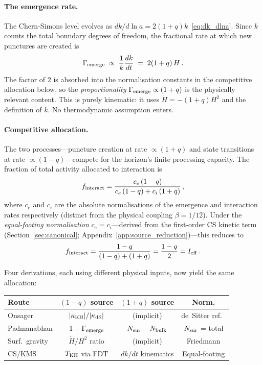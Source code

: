 \documentclass[aps,prd,twocolumn,10pt,superscriptaddress,nofootinbib]{revtex4-2}
\begin{document}
\paragraph{The emergence rate.}

The Chern-Simons level evolves as
$dk/d\ln a = 2(1+q)k$~\eqref{eq:dk_dlna}.  Since $k$ counts
the total boundary degrees of freedom, the fractional rate at
which new punctures are created is
\begin{equation}
\Gamma_{\rm emerge} \;\propto\;
  \frac{1}{k}\frac{dk}{dt} \;=\; 2(1+q)\,H\,.
\label{eq:rate_emerge}
\end{equation}
The factor of $2$ is absorbed into the normalisation constants
in the competitive allocation below, so the
\emph{proportionality} $\Gamma_{\rm emerge} \propto (1+q)$ is the
physically relevant content.  This is purely kinematic: it uses
$\dot{H} = -(1+q)H^2$ and the definition of $k$.  No
thermodynamic assumption enters.


\paragraph{Competitive allocation.}

The two processes---puncture creation at rate $\propto (1+q)$ and
state transitions at rate $\propto (1-q)$---compete for the
horizon's finite processing capacity.  The fraction of total
activity allocated to interaction is
\begin{equation}
f_{\rm interact}
  = \frac{c_e\,(1-q)}{c_e\,(1-q) + c_i\,(1+q)}\,,
\label{eq:competitive}
\end{equation}
where $c_e$ and $c_i$ are the absolute normalisations of
the emergence and interaction rates respectively (distinct
from the physical coupling $\beta = 1/12$).  Under the
\emph{equal-footing normalisation} $c_e = c_i$---derived from
the first-order CS kinetic term
(Section~\ref{sec:canonical};
Appendix~\ref{app:source_reduction})---this reduces to
\begin{equation}
f_{\rm interact}
  = \frac{1-q}{(1-q) + (1+q)}
  = \frac{1-q}{2}
  = I_{\rm eff}\,.
\label{eq:f_from_KMS}
\end{equation}

Four derivations, each using different physical inputs, now yield
the same allocation:

\begin{center}
\footnotesize
\begin{tabular}{lccc}
\toprule
Route & $(1{-}q)$ source & $(1{+}q)$ source &
  Norm. \\
\midrule
Onsager & $|\kappa_{\rm KH}|/|\kappa_{\rm dS}|$ &
  (implicit) & de~Sitter ref.\ \\
Padmanabhan & $1 - \Gamma_{\rm emerge}$ &
  $N_{\rm sur} - N_{\rm bulk}$ &
  $N_{\rm sur}$ = total \\
Surf.\ gravity & $\dot{H}/H^2$ ratio &
  (implicit) & Friedmann \\
CS/KMS & $T_{\rm KH}$ via FDT &
  $dk/dt$ kinematics & Equal-footing \\
\bottomrule
\end{tabular}
\end{center}
\end{document}
